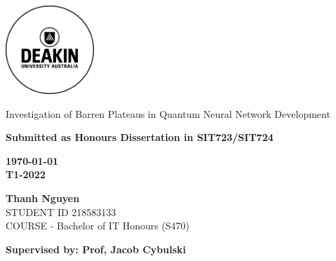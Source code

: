 \thispagestyle{empty}
\begin{titlepage}
    \includegraphics[width=0.25\textwidth]{src/CoverPage/Deakin_Logo.jpeg}
        \begin{center}
        \vspace*{4cm}
        {\LARGE Investigation of Barren Plateaus in Quantum Neural Network Development}
        \vspace{3cm}
            \begin{large}   
    
        
            \bf Submitted as Honours Dissertation in SIT723/SIT724
            \vspace{1cm}
        
            \bf \today \\
            T1-2022        
        
            \vspace{3cm}
            \textbf{Thanh Nguyen}\\
            STUDENT ID 218583133 \\
            COURSE - Bachelor of IT Honours (S470)
            \vfill

            \bf \normalsize Supervised by: Prof, Jacob Cybulski\\
       
        \end{large}  
   \end{center}
\end{titlepage}
